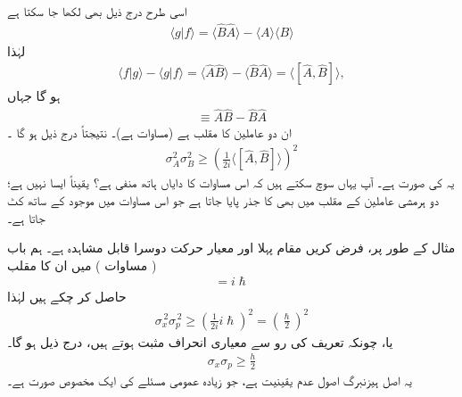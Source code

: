اسی طرح درج ذیل بھی لکھا جا سکتا ہے 
\begin{align*}
\langle g|f \rangle = \langle \hat{B}\hat{A} \rangle - \langle A \rangle \langle B \rangle 
\end{align*}
لہٰذا 
\begin{align*}
\langle f|g \rangle - \langle g|f \rangle = \langle \hat{A}\hat{B} \rangle -\langle \hat{B}\hat{A} \rangle = \langle [ \hat{A} , \hat{B}] \rangle ,
\end{align*}
ہو گا جہاں
\begin{align*}
[\hat{A} , \hat{B}] \equiv \hat{A} \hat{B} - \hat{B}\hat{A}
\end{align*}
 ان دو عاملین کا مقلب ہے (مساوات  ہے)۔ نتیجتاً درج ذیل ہو گا ۔
\begin{align}\label{مساوات_قواعد_عمومی_اصول_عدم_یقینیت_الف_بے}
\sigma_{A}^{2} \sigma_{B}^{2} \geq \left(\frac{1}{2i} \langle [\hat{A} , \hat{B}] \rangle \right)^{2}
\end{align}
یہ  کی صورت ہے۔ آپ یہاں سوچ سکتے ہیں کہ اس مساوات کا دایاں ہاتھ منفی ہے؟ یقیناً ایسا نہیں ہے؛ دو ہرمشی عاملین کے مقلب میں بھی  کا جذر پایا جاتا ہے جو اس مساوات میں موجود  کے ساتھ کٹ جاتا ہے۔ 

مثال کے طور پر، فرض کریں مقام  پہلا اور معیار حرکت  دوسرا قابل مشاہدہ ہے۔ ہم باب  ( مساوات ) میں ان کا مقلب
\begin{align*}
[ \hat{x}, \hat{p} ] = i \hslash
\end{align*}
حاصل کر چکے ہیں لہٰذا
\begin{align*}
\sigma_{x}^{\,2} \sigma_{p}^{\,2} \geq \left( \frac{1}{2i} i \hslash \right)^{2} = \left( \frac{\hslash}{2} \right)^{2}
\end{align*}
یا، چونکہ تعریف کی رو سے معیاری انحراف مثبت ہوتے ہیں، درج ذیل ہو گا۔
\begin{align}
\sigma_{x} \sigma_{p} \geq \frac{h}{2}
\end{align}
یہ اصل ہیزنبرگ اصول عدم یقینیت ہے، جو زیادہ عمومی مسئلے کی ایک مخصوص صورت ہے۔

